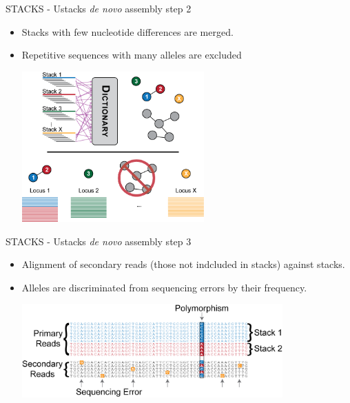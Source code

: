 \documentclass[presentation]{beamer}
\begin{document}
\begin{frame}[label=sec-4-1-4]{STACKS - Ustacks \emph{de novo} assembly step 2}
\begin{itemize}
\item Stacks with few nucleotide differences are merged.
\item Repetitive sequences with many alleles are excluded
\begin{center}
\includegraphics[width=7cm]{Catchen2013DeNovoStep2.png}

\tiny{\citep{Catchen2013a}}
\end{center}
\end{itemize}
\end{frame}


\begin{frame}[label=sec-4-1-5]{STACKS - Ustacks \emph{de novo} assembly step 3}
\begin{itemize}
\item Alignment of secondary reads (those not indcluded in stacks) against
stacks.
\item Alleles are discriminated from sequencing errors by their frequency.
\begin{center}
\includegraphics[width=10cm]{Catchen2013DeNovoStep3.png}

\tiny{\citep{Catchen2013a}}
\end{center}
\end{itemize}
\end{frame}
\end{document}
